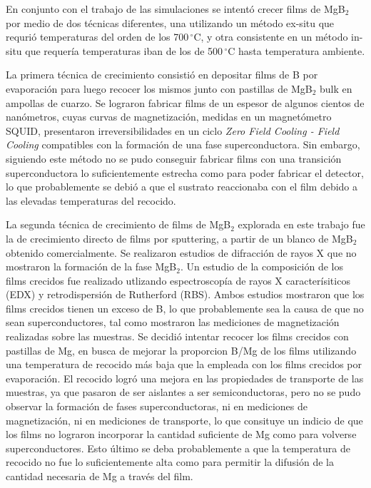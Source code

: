 \begin{resumen}
En conjunto con el trabajo de las simulaciones se intentó crecer films de MgB$_2$ por medio de dos técnicas diferentes, una utilizando un método ex-situ que requrió temperaturas del orden de los 700\,$^{\circ}$C, y otra consistente en un método in-situ que requería temperaturas iban de los de 500\,$^{\circ}$C hasta temperatura ambiente.

La primera técnica de crecimiento consistió en depositar films de B por evaporación para luego recocer los mismos junto con pastillas de MgB$_2$ bulk en ampollas de cuarzo. Se lograron fabricar films de un espesor de algunos cientos de nanómetros, cuyas curvas de magnetización, medidas en un magnetómetro SQUID, presentaron irreversibilidades en un ciclo \textit{Zero Field Cooling - Field Cooling} compatibles con la formación de una fase superconductora. Sin embargo, siguiendo este método no se pudo conseguir fabricar films con una transición superconductora lo suficientemente estrecha como para poder fabricar el detector, lo que probablemente se debió a que el sustrato reaccionaba con el film debido a las elevadas temperaturas del recocido.

La segunda técnica de crecimiento de films de MgB$_2$ explorada en este trabajo fue la de crecimiento directo de films por sputtering, a partir de un blanco de MgB$_2$ obtenido comercialmente. Se realizaron estudios de difracción de rayos X que no mostraron la formación de la fase MgB$_2$. Un estudio de la composición de los films crecidos fue realizado utlizando espectroscopía de rayos X caracterísiticos (EDX) y retrodispersión de Rutherford (RBS). Ambos estudios mostraron que los films crecidos tienen un exceso de B, lo que probablemente sea la causa de que no sean superconductores, tal como mostraron las mediciones de magnetización realizadas sobre las muestras. Se decidió intentar recocer los films crecidos con pastillas de Mg, en busca de mejorar la proporcion B/Mg de los films utilizando una temperatura de recocido más baja que la empleada con los films crecidos por evaporación. El recocido logró una mejora en las propiedades de transporte de las muestras, ya que pasaron de ser aislantes a ser semiconductoras, pero no se pudo observar la formación de fases superconductoras, ni en mediciones de magnetización, ni en mediciones de transporte, lo que consituye un indicio de que los films no lograron incorporar la cantidad suficiente de Mg como para volverse superconductores. Esto último se deba probablemente a que la temperatura de recocido no fue lo suficientemente alta como para permitir la difusión de la cantidad necesaria de Mg a través del film.
\end{resumen}

